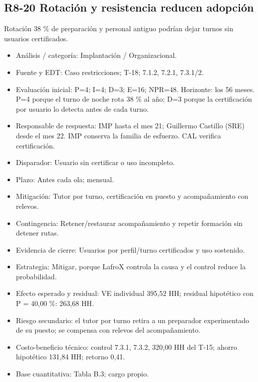 \subsection*{R8-20 \textemdash{} Rotación y resistencia reducen adopción}

Rotación 38 \% de preparación y personal antiguo podrían dejar turnos sin usuarios certificados.

\begin{itemize}[leftmargin=*,itemsep=3pt]
\item Análisis / categoría: Implantación / Organizacional.
\item Fuente y EDT: Caso restricciones; T-18; 7.1.2, 7.2.1, 7.3.1/2.
\item Evaluación inicial: P=4; I=4; D=3; E=16; NPR=48. Horizonte: los 56 meses. P=4 porque el turno de noche rota 38 \% al año; D=3 porque la certificación por usuario lo detecta antes de cada turno.
\item Responsable de respuesta: IMP hasta el mes 21; Guillermo Castillo (SRE) desde el mes 22. IMP conserva la familia de esfuerzo. CAL verifica certificación.
\item Disparador: Usuario sin certificar o uso incompleto.
\item Plazo: Antes cada ola; mensual.
\item Mitigación: Tutor por turno, certificación en puesto y acompañamiento con relevos.
\item Contingencia: Retener/restaurar acompañamiento y repetir formación sin detener rutas.
\item Evidencia de cierre: Usuarios por perfil/turno certificados y uso sostenido.
\item Estrategia: Mitigar, porque LafroX controla la causa y el control reduce la probabilidad.
\item Efecto esperado y residual: VE individual 395,52 HH; residual hipotético con P = 40,00 \%: 263,68 HH.
\item Riesgo secundario: el tutor por turno retira a un preparador experimentado de su puesto; se compensa con relevos del acompañamiento.
\item Costo-beneficio técnico: control 7.3.1, 7.3.2, 320,00 HH del T-15; ahorro hipotético 131,84 HH; retorno 0,41.
\item Base cuantitativa: Tabla B.3; cargo propio.
\end{itemize}

